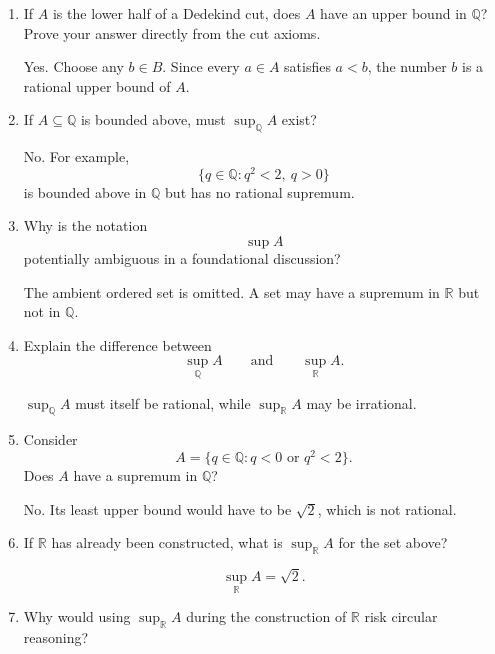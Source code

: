 \documentclass{self-check}
\begin{document}
\begin{enumerate}[label=\arabic*., itemsep=10pt]
\item If $A$ is the lower half of a Dedekind cut, does $A$ have an upper bound in $\mathbb{Q}$?
Prove your answer directly from the cut axioms.

\begin{answer}
Yes. Choose any $b\in B$. Since every $a\in A$ satisfies $a<b$, the number $b$ is a rational upper bound of $A$.
\end{answer}

\item If $A\subseteq\mathbb{Q}$ is bounded above, must $\sup_{\mathbb{Q}}A$ exist?

\begin{answer}
No. For example,
\[
\{q\in\mathbb{Q}:q^2<2,\ q>0\}
\]
is bounded above in $\mathbb{Q}$ but has no rational supremum.
\end{answer}

\item Why is the notation
\[
\sup A
\]
potentially ambiguous in a foundational discussion?

\begin{answer}
The ambient ordered set is omitted. A set may have a supremum in $\mathbb{R}$ but not in $\mathbb{Q}$.
\end{answer}

\item Explain the difference between
\[
\sup_{\mathbb{Q}}A
\qquad\text{and}\qquad
\sup_{\mathbb{R}}A.
\]

\begin{answer}
$\sup_{\mathbb{Q}}A$ must itself be rational, while $\sup_{\mathbb{R}}A$ may be irrational.
\end{answer}

\item Consider
\[
A=\{q\in\mathbb{Q}:q<0\text{ or }q^2<2\}.
\]
Does $A$ have a supremum in $\mathbb{Q}$?

\begin{answer}
No. Its least upper bound would have to be $\sqrt2$, which is not rational.
\end{answer}

\item If $\mathbb{R}$ has already been constructed, what is $\sup_{\mathbb{R}}A$ for the set above?

\begin{answer}
\[
\sup_{\mathbb{R}}A=\sqrt2.
\]
\end{answer}

\item Why would using $\sup_{\mathbb{R}}A$ during the construction of $\mathbb{R}$ risk circular reasoning?


\end{enumerate}
\end{document}

